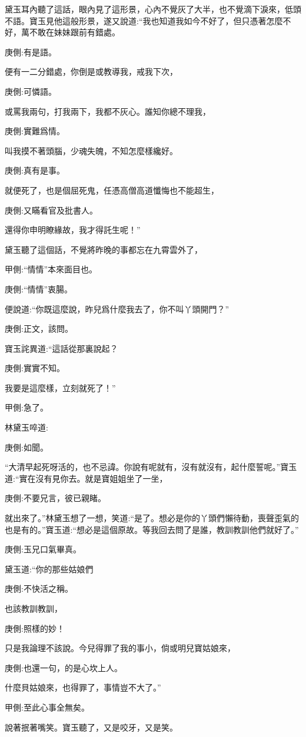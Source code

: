 \begin{parag}
    黛玉耳內聽了這話，眼內見了這形景，心內不覺灰了大半，也不覺滴下淚來，低頭不語。寶玉見他這般形景，遂又說道:“我也知道我如今不好了，但只憑著怎麼不好，萬不敢在妹妹跟前有錯處。\begin{note}庚側:有是語。\end{note}便有一二分錯處，你倒是或教導我，戒我下次，\begin{note}庚側:可憐語。\end{note}或罵我兩句，打我兩下，我都不灰心。誰知你總不理我，\begin{note}庚側:實難爲情。\end{note}叫我摸不著頭腦，少魂失魄，不知怎麼樣纔好。\begin{note}庚側:真有是事。\end{note}就便死了，也是個屈死鬼，任憑高僧高道懺悔也不能超生，\begin{note}庚側:又瞞看官及批書人。\end{note}還得你申明瞭緣故，我才得託生呢！”
\end{parag}


\begin{parag}
    黛玉聽了這個話，不覺將昨晚的事都忘在九霄雲外了，\begin{note}甲側:“情情”本來面目也。\end{note}\begin{note}庚側:“情情”衷腸。\end{note}便說道:“你既這麼說，昨兒爲什麼我去了，你不叫丫頭開門？”\begin{note}庚側:正文，該問。\end{note}寶玉詫異道:“這話從那裏說起？\begin{note}庚側:實實不知。\end{note}我要是這麼樣，立刻就死了！”\begin{note}甲側:急了。\end{note}林黛玉啐道:\begin{note}庚側:如聞。\end{note}“大清早起死呀活的，也不忌諱。你說有呢就有，沒有就沒有，起什麼誓呢。”寶玉道:“實在沒有見你去。就是寶姐姐坐了一坐，\begin{note}庚側:不要兄言，彼已親睹。\end{note}就出來了。”林黛玉想了一想，笑道:“是了。想必是你的丫頭們懶待動，喪聲歪氣的也是有的。”寶玉道:“想必是這個原故。等我回去問了是誰，教訓教訓他們就好了。”\begin{note}庚側:玉兄口氣畢真。\end{note}黛玉道:“你的那些姑娘們\begin{note}庚側:不快活之稱。\end{note}也該教訓教訓，\begin{note}庚側:照樣的妙！\end{note}只是我論理不該說。今兒得罪了我的事小，倘或明兒寶姑娘來，\begin{note}庚側:也還一句，的是心坎上人。\end{note}什麼貝姑娘來，也得罪了，事情豈不大了。”\begin{note}甲側:至此心事全無矣。\end{note}說著抿著嘴笑。寶玉聽了，又是咬牙，又是笑。
\end{parag}


